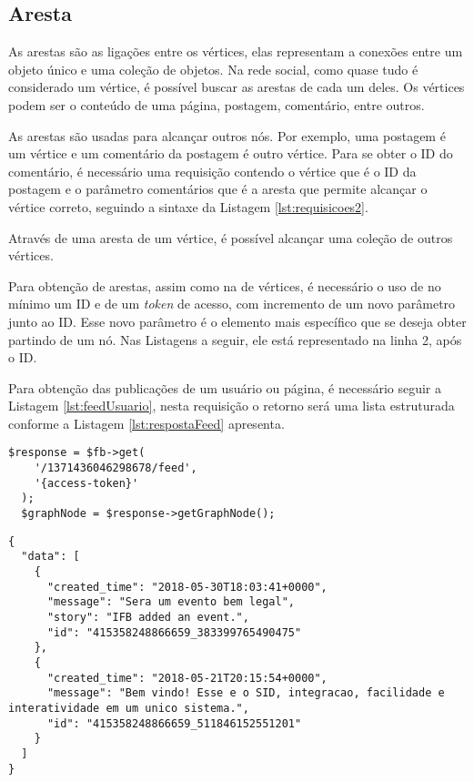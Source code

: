\subsection{Aresta}
As arestas são as ligações entre os vértices, elas representam a conexões entre um objeto único e uma coleção de objetos. Na rede social, como quase tudo é considerado um vértice, é possível buscar as arestas de cada um deles. Os vértices podem ser o conteúdo de uma página, postagem, comentário, entre outros.

As arestas são usadas para alcançar outros nós. Por exemplo, uma postagem é um vértice e um comentário da postagem é outro vértice. Para se obter o ID do comentário, é necessário uma requisição contendo o vértice que é o ID da postagem e o parâmetro comentários que é a aresta que permite alcançar o vértice correto, seguindo a sintaxe da Listagem \ref{lst:requisicoes2}.

Através de uma aresta de um vértice, é possível alcançar uma coleção de outros vértices.

Para obtenção de arestas, assim como na de vértices, é necessário o uso de no mínimo um ID e de um \textit{token} de acesso, com incremento de um novo parâmetro junto ao ID. Esse novo parâmetro é o elemento mais específico que se deseja obter partindo de um nó. Nas Listagens a seguir, ele está representado na linha 2, após o ID.

Para obtenção das publicações de um usuário ou página, é necessário seguir a Listagem \ref{lst:feedUsuario}, nesta requisição o retorno será uma lista estruturada conforme a Listagem \ref{lst:respostaFeed} apresenta.

\begin{lstlisting}[caption={Requisitando todas as publicações de um usuário},label={lst:feedUsuario}]
  $response = $fb->get( 
    '/1371436046298678/feed', 
    '{access-token}'
  );
  $graphNode = $response->getGraphNode();
\end{lstlisting}

\begin{lstlisting}[caption={Resposta da requisição \ref{lst:feedUsuario} (Feed)},label={lst:respostaFeed}]
{
  "data": [
    {
      "created_time": "2018-05-30T18:03:41+0000",
      "message": "Sera um evento bem legal",
      "story": "IFB added an event.",
      "id": "415358248866659_383399765490475"
    },
    {
      "created_time": "2018-05-21T20:15:54+0000",
      "message": "Bem vindo! Esse e o SID, integracao, facilidade e interatividade em um unico sistema.",
      "id": "415358248866659_511846152551201"
    }
  ]
}
\end{lstlisting}

